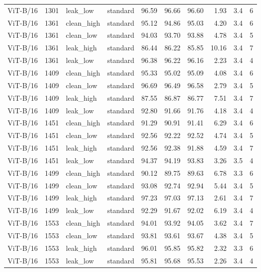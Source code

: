 {\begin{longtable}{lrllrrrrrr}
ViT-B/16 & 1301 & leak\_low & standard & 96.59 & 96.66 & 96.60 & 1.93 & 3.4 & 6 \\
ViT-B/16 & 1361 & clean\_high & standard & 95.12 & 94.86 & 95.03 & 4.20 & 3.4 & 6 \\
ViT-B/16 & 1361 & clean\_low & standard & 94.03 & 93.70 & 93.88 & 4.78 & 3.4 & 5 \\
ViT-B/16 & 1361 & leak\_high & standard & 86.44 & 86.22 & 85.85 & 10.16 & 3.4 & 7 \\
ViT-B/16 & 1361 & leak\_low & standard & 96.38 & 96.22 & 96.16 & 2.23 & 3.4 & 4 \\
ViT-B/16 & 1409 & clean\_high & standard & 95.33 & 95.02 & 95.09 & 4.08 & 3.4 & 6 \\
ViT-B/16 & 1409 & clean\_low & standard & 96.69 & 96.49 & 96.58 & 2.79 & 3.4 & 5 \\
ViT-B/16 & 1409 & leak\_high & standard & 87.55 & 86.87 & 86.77 & 7.51 & 3.4 & 7 \\
ViT-B/16 & 1409 & leak\_low & standard & 92.80 & 91.66 & 91.76 & 4.18 & 3.4 & 4 \\
ViT-B/16 & 1451 & clean\_high & standard & 91.29 & 90.91 & 91.41 & 6.29 & 3.4 & 6 \\
ViT-B/16 & 1451 & clean\_low & standard & 92.56 & 92.22 & 92.52 & 4.74 & 3.4 & 5 \\
ViT-B/16 & 1451 & leak\_high & standard & 92.56 & 92.38 & 91.88 & 4.59 & 3.4 & 7 \\
ViT-B/16 & 1451 & leak\_low & standard & 94.37 & 94.19 & 93.83 & 3.26 & 3.5 & 4 \\
ViT-B/16 & 1499 & clean\_high & standard & 90.12 & 89.75 & 89.63 & 6.78 & 3.3 & 6 \\
ViT-B/16 & 1499 & clean\_low & standard & 93.08 & 92.74 & 92.94 & 5.44 & 3.4 & 5 \\
ViT-B/16 & 1499 & leak\_high & standard & 97.23 & 97.03 & 97.13 & 2.61 & 3.4 & 7 \\
ViT-B/16 & 1499 & leak\_low & standard & 92.29 & 91.67 & 92.02 & 6.19 & 3.4 & 4 \\
ViT-B/16 & 1553 & clean\_high & standard & 94.01 & 93.92 & 94.05 & 3.62 & 3.4 & 7 \\
ViT-B/16 & 1553 & clean\_low & standard & 93.81 & 93.61 & 93.67 & 4.38 & 3.4 & 5 \\
ViT-B/16 & 1553 & leak\_high & standard & 96.01 & 95.85 & 95.82 & 2.32 & 3.3 & 6 \\
ViT-B/16 & 1553 & leak\_low & standard & 95.81 & 95.68 & 95.53 & 2.26 & 3.4 & 4 \\

\end{longtable}}

